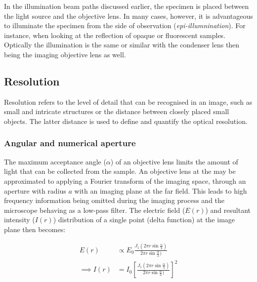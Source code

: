 In the illumination beam paths discussed earlier, the specimen is placed between the light source and the objective lens.
In many cases, however, it is advantageous to illuminate the specimen from the side of observation (\emph{epi-illumnination}).
For instance, when looking at the reflection of opaque or fluorescent samples.
Optically the illumination is the same or similar with the condenser lens then being the imaging objective lens as well.

\subsection{Resolution}

Resolution refers to the level of detail that can be recognised in an image, such as small and intricate structures or the distance between closely placed small objects.
The latter distance is used to define and quantify the optical resolution.

\subsubsection{Angular and numerical aperture}

The maximum acceptance angle ($\alpha$) of an objective lens limits the amount of light that can be collected from the sample.
An objective lens at the may be approximated to applying a Fourier transform of the imaging space, through an aperture with radius $a$ with an imaging plane at the far field.
This leads to high frequency information being omitted during the imaging process and the microscope behaving as a low-pass filter.
The electric field ($E(r)$) and resultant intensity ($I(r)$) distribution of a single point (delta function) at the image plane then becomes:

\begin{align}
    E(r) &\propto E_0 \frac{J_1 \left(2\pi r \sin \frac{\alpha}{\lambda}\right)}{2\pi r \sin \frac{\alpha}{\lambda})}\label{eq:E_airy}\\
    \implies
    I(r) &= I_0 \left[\frac{J_1 \left(2\pi r \sin \frac{\alpha}{\lambda}\right)}{2\pi r \sin \frac{\alpha}{\lambda})}\right]^2\label{eq:I_airy}
\end{align}


